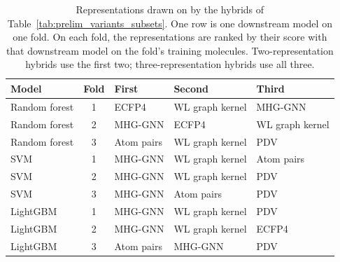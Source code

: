 \begin{table}[htbp]
\centering
\small
\begin{tabular}{@{}lclll@{}}
\toprule
Model & Fold & First & Second & Third \\
\midrule
Random forest & 1 & ECFP4 & WL graph kernel & MHG-GNN \\
Random forest & 2 & MHG-GNN & ECFP4 & WL graph kernel \\
Random forest & 3 & Atom pairs & WL graph kernel & PDV \\
SVM & 1 & MHG-GNN & WL graph kernel & Atom pairs \\
SVM & 2 & MHG-GNN & WL graph kernel & PDV \\
SVM & 3 & MHG-GNN & Atom pairs & PDV \\
LightGBM & 1 & MHG-GNN & WL graph kernel & PDV \\
LightGBM & 2 & MHG-GNN & WL graph kernel & ECFP4 \\
LightGBM & 3 & Atom pairs & MHG-GNN & PDV \\
\bottomrule
\end{tabular}
\caption[Representations drawn on by the two- and three-representation hybrids.]{Representations drawn on by the hybrids of Table~\ref{tab:prelim_variants_subsets}. One row is one downstream model on one fold. On each fold, the representations are ranked by their score with that downstream model on the fold's training molecules. Two-representation hybrids use the first two; three-representation hybrids use all three.}
\label{tab:prelim_variants_subset_reps}
\end{table}

